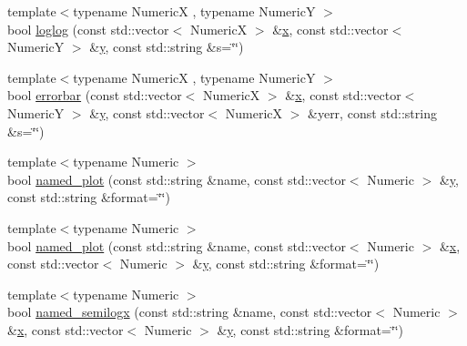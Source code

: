 \begin{DoxyCompactItemize}
\item 
{\footnotesize template$<$typename NumericX , typename NumericY $>$ }\\bool \mbox{\hyperlink{namespacematplotlibcpp_a6cfa8cba00f52a2c4614fa7a8a0bcd2b}{loglog}} (const std\+::vector$<$ NumericX $>$ \&\mbox{\hyperlink{plottingTest_8cpp_aa0155849a1850c1edcfe7bce685b08f1}{x}}, const std\+::vector$<$ NumericY $>$ \&\mbox{\hyperlink{plottingTest_8cpp_a64d0474b77956c0e971da1b6cb1ddacd}{y}}, const std\+::string \&s=\char`\"{}\char`\"{})
\item 
{\footnotesize template$<$typename NumericX , typename NumericY $>$ }\\bool \mbox{\hyperlink{namespacematplotlibcpp_a1ed29787f67ecb8c156e7c4abbcd25b4}{errorbar}} (const std\+::vector$<$ NumericX $>$ \&\mbox{\hyperlink{plottingTest_8cpp_aa0155849a1850c1edcfe7bce685b08f1}{x}}, const std\+::vector$<$ NumericY $>$ \&\mbox{\hyperlink{plottingTest_8cpp_a64d0474b77956c0e971da1b6cb1ddacd}{y}}, const std\+::vector$<$ NumericX $>$ \&yerr, const std\+::string \&s=\char`\"{}\char`\"{})
\item 
{\footnotesize template$<$typename Numeric $>$ }\\bool \mbox{\hyperlink{namespacematplotlibcpp_a6461c03041d9947a0e3b3593b5b72c95}{named\+\_\+plot}} (const std\+::string \&name, const std\+::vector$<$ Numeric $>$ \&\mbox{\hyperlink{plottingTest_8cpp_a64d0474b77956c0e971da1b6cb1ddacd}{y}}, const std\+::string \&format=\char`\"{}\char`\"{})
\item 
{\footnotesize template$<$typename Numeric $>$ }\\bool \mbox{\hyperlink{namespacematplotlibcpp_a547854898d3b05c1ed182ad744545f43}{named\+\_\+plot}} (const std\+::string \&name, const std\+::vector$<$ Numeric $>$ \&\mbox{\hyperlink{plottingTest_8cpp_aa0155849a1850c1edcfe7bce685b08f1}{x}}, const std\+::vector$<$ Numeric $>$ \&\mbox{\hyperlink{plottingTest_8cpp_a64d0474b77956c0e971da1b6cb1ddacd}{y}}, const std\+::string \&format=\char`\"{}\char`\"{})
\item 
{\footnotesize template$<$typename Numeric $>$ }\\bool \mbox{\hyperlink{namespacematplotlibcpp_a7696c0134091453723de840be016e43a}{named\+\_\+semilogx}} (const std\+::string \&name, const std\+::vector$<$ Numeric $>$ \&\mbox{\hyperlink{plottingTest_8cpp_aa0155849a1850c1edcfe7bce685b08f1}{x}}, const std\+::vector$<$ Numeric $>$ \&\mbox{\hyperlink{plottingTest_8cpp_a64d0474b77956c0e971da1b6cb1ddacd}{y}}, const std\+::string \&format=\char`\"{}\char`\"{})
\item 

\end{DoxyCompactItemize}
